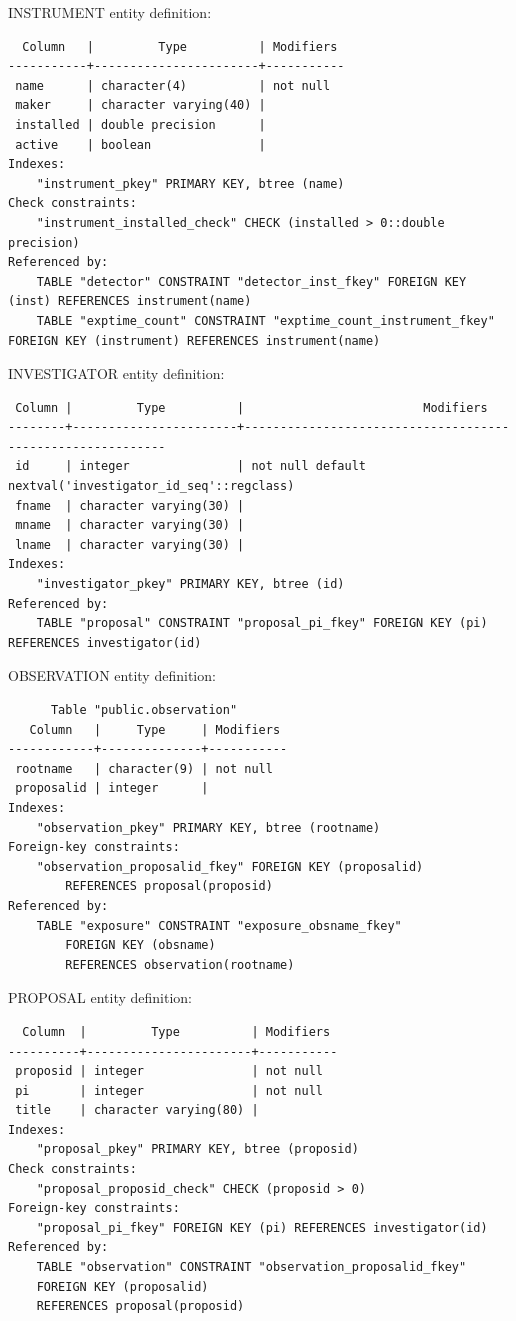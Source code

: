 \documentclass[a4paper,11pt]{article}
\begin{document}
\hrulefill

INSTRUMENT entity definition:
\begin{verbatim}
  Column   |         Type          | Modifiers 
-----------+-----------------------+-----------
 name      | character(4)          | not null
 maker     | character varying(40) | 
 installed | double precision      | 
 active    | boolean               | 
Indexes:
    "instrument_pkey" PRIMARY KEY, btree (name)
Check constraints:
    "instrument_installed_check" CHECK (installed > 0::double precision)
Referenced by:
    TABLE "detector" CONSTRAINT "detector_inst_fkey" FOREIGN KEY (inst) REFERENCES instrument(name)
    TABLE "exptime_count" CONSTRAINT "exptime_count_instrument_fkey" FOREIGN KEY (instrument) REFERENCES instrument(name)
\end{verbatim}

\hrulefill

INVESTIGATOR entity definition:
\begin{verbatim}
 Column |         Type          |                         Modifiers                         
--------+-----------------------+-----------------------------------------------------------
 id     | integer               | not null default nextval('investigator_id_seq'::regclass)
 fname  | character varying(30) | 
 mname  | character varying(30) | 
 lname  | character varying(30) | 
Indexes:
    "investigator_pkey" PRIMARY KEY, btree (id)
Referenced by:
    TABLE "proposal" CONSTRAINT "proposal_pi_fkey" FOREIGN KEY (pi) REFERENCES investigator(id)
\end{verbatim}

\hrulefill

OBSERVATION entity definition:
\begin{verbatim}
      Table "public.observation"
   Column   |     Type     | Modifiers 
------------+--------------+-----------
 rootname   | character(9) | not null
 proposalid | integer      | 
Indexes:
    "observation_pkey" PRIMARY KEY, btree (rootname)
Foreign-key constraints:
    "observation_proposalid_fkey" FOREIGN KEY (proposalid) 
        REFERENCES proposal(proposid)
Referenced by:
    TABLE "exposure" CONSTRAINT "exposure_obsname_fkey" 
        FOREIGN KEY (obsname) 
        REFERENCES observation(rootname)
\end{verbatim}

\hrulefill


PROPOSAL entity definition:
\begin{verbatim}
  Column  |         Type          | Modifiers 
----------+-----------------------+-----------
 proposid | integer               | not null
 pi       | integer               | not null
 title    | character varying(80) | 
Indexes:
    "proposal_pkey" PRIMARY KEY, btree (proposid)
Check constraints:
    "proposal_proposid_check" CHECK (proposid > 0)
Foreign-key constraints:
    "proposal_pi_fkey" FOREIGN KEY (pi) REFERENCES investigator(id)
Referenced by:
    TABLE "observation" CONSTRAINT "observation_proposalid_fkey" 
    FOREIGN KEY (proposalid) 
    REFERENCES proposal(proposid)
\end{verbatim}
\end{document}

